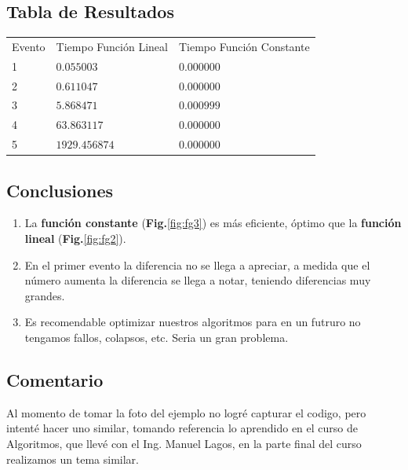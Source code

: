 \subsection{Tabla de Resultados}
\begin{table}[H]
	\centering
	\begin{tabular}{L{1.2cm}C{4cm}C{4.5cm}}
		Evento & Tiempo Función Lineal & Tiempo Función Constante \\
		1                        & $0.055003$            & $0.000000$               \\
		2                        & $0.611047$            & $0.000000$               \\
		3                        & $5.868471$            & $0.000999$               \\
		4                        & $63.863117$           & $0.000000$               \\
		5                        & $1929.456874$         & $0.000000$               \\
	\end{tabular}
\end{table}
\cleardoublepage%
\subsection{Conclusiones}
\begin{enumerate}[label=\itemcirccz{azzul}{\arabic*},itemsep=2pt]
	\item La \textbf{\color{azulicg}función constante} (\textbf{Fig.}\ref{fig:fg3}) es
	      más eficiente, óptimo que la \textbf{\color{azulicg}función lineal}
	      (\textbf{Fig.}\ref{fig:fg2}).
	\item En el primer evento la diferencia no se llega a apreciar, a medida que el
	      número aumenta la diferencia se llega a notar, teniendo diferencias muy
	      grandes.
	\item Es recomendable optimizar nuestros algoritmos para en un futruro no tengamos
	      fallos, colapsos, etc. Seria un gran problema.
\end{enumerate}
\subsection{Comentario}
Al momento de tomar la foto del ejemplo no logré capturar el codigo, pero
intenté hacer uno similar, tomando referencia lo aprendido en el curso de
Algoritmos, que llevé con el Ing. Manuel Lagos, en la parte final del curso
realizamos un tema similar.